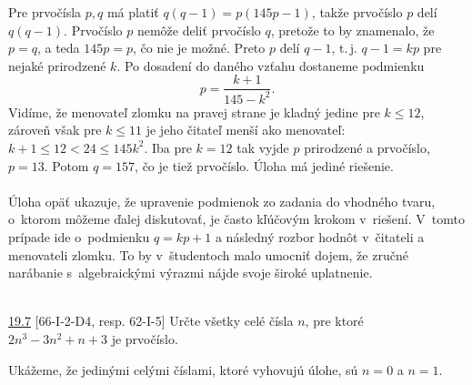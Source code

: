 \rieh Pre prvočísla $p, q$ má platiť $q(q - 1) = p(145p -1)$, takže prvočíslo $p$ delí $q(q -1)$. Prvočíslo $p$ nemôže deliť prvočíslo $q$, pretože to by znamenalo, že $p = q$, a teda $145p = p$, čo nie je možné. Preto $p$ delí $q-1$,  t.\,j. $q - 1 = kp$ pre nejaké prirodzené $k$. Po dosadení do daného vzťahu dostaneme podmienku $$p=\frac{k+1}{145-k^2}.$$ Vidíme, že menovateľ zlomku na pravej strane je kladný jedine pre $k \leq 12$, zároveň však pre $k \leq 11$ je jeho čitateľ menší ako menovateľ: $k + 1 \leq 12 < 24 \leq 145 k^2$. Iba pre $k = 12$ tak vyjde $p$ prirodzené a prvočíslo, $p = 13$. Potom $q = 157$, čo je tiež prvočíslo. Úloha má jediné riešenie.\\
\\
\kom Úloha opäť ukazuje, že upravenie podmienok zo zadania do vhodného tvaru, o~ktorom môžeme ďalej diskutovať, je často kľúčovým krokom v~riešení. V~tomto prípade ide o~podmienku $q=kp+1$ a následný rozbor hodnôt v~čitateli a menovateli zlomku. To by v~študentoch malo umocniť dojem, že zručné narábanie s~algebraickými výrazmi nájde svoje široké uplatnenie.\\
\\
\begin{tcolorbox}[breakable,notitle,boxrule=0pt,colback=light-gray,colframe=light-gray]\ul{19.7} [66-I-2-D4, resp. 62-I-5]
Určte všetky celé čísla $n$, pre ktoré $2n^3 -3n^2 +n+3$ je prvočíslo.

\end{tcolorbox}

\rieh Ukážeme, že jedinými celými číslami, ktoré vyhovujú úlohe, sú $n = 0$ a $n = 1$.

